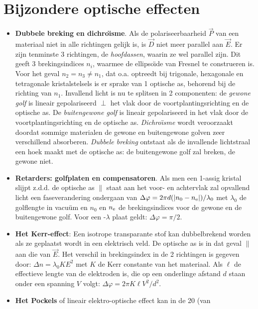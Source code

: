 \documentclass[twoside]{report}
\begin{document}
\section{Bijzondere optische effecten}
\begin{itemize}
\item {\bf Dubbele breking en dichro\"{\i}sme}.
      Als de polariseerbaarheid $\vec{P}$ van een materiaal niet in alle
      richtingen gelijk is, is $\vec{D}$ niet meer parallel aan $\vec{E}$.
      Er zijn tenminste 3 richtingen, de {\it hoofdassen}, waarin ze wel
      parallel zijn. Dit geeft 3 brekingsindices $n_i$, waarmee de
      ellipso\"{\i}de van Fresnel te construeren is. Voor het geval
      $n_2=n_3\neq n_1$, dat o.a. optreedt bij trigonale, hexagonale en
      tetragonale kristalstelsels is er sprake van 1 optische as, behorend bij
      de richting van $n_1$. Invallend licht is nu te splitsen in 2
      componenten: de {\it gewone golf} is lineair gepolariseerd $\perp$ het
      vlak door de voortplantingsrichting en de optische as. De
      {\it buitengewone golf} is lineair gepolariseerd in het vlak door de
      voortplantingsrichting en de optische as.
      {\it Dichro\"{\i}sme} wordt veroorzaakt doordat sommige materialen de
      gewone en buitengewone golven zeer verschillend absorberen.
      {\it Dubbele breking} ontstaat als de invallende lichtstraal een hoek
      maakt met de optische as: de buitengewone golf zal breken, de gewone niet.
\item {\bf Retarders: golfplaten en compensatoren}. Als men een 1-assig
      kristal slijpt z.d.d. de optische as $\parallel$ staat aan het voor- en
      achtervlak zal opvallend licht een faseverandering ondergaan van
      $\Delta\varphi=2\pi d(|n_0-n_{\rm e}|)/\lambda_0$ met $\lambda_0$ de
      golflengte in vacu\"um en $n_0$ en $n_{\rm e}$ de brekingsindices voor
      de gewone en de buitengewone golf. Voor een \kwart-$\lambda$ plaat
      geldt: $\Delta\varphi=\pi/2$.
\item {\bf Het Kerr-effect}: Een isotrope transparante stof kan dubbelbrekend
      worden als ze geplaatst wordt in een elektrisch veld. De optische as is
      in dat geval $\parallel$ aan die van $\vec{E}$. Het verschil in
      brekingsindex in de 2 richtingen is gegeven door: $\Delta n=\lambda_0KE^2$
      met $K$ de Kerr constante van het materiaal. Als $\ell$ de effectieve
      lengte van de elektroden is, die op een onderlinge afstand $d$ staan
      onder een spanning $V$ volgt: $\Delta\varphi=2\pi K\ell V^2/d^2$.
\item {\bf Het Pockels} of lineair elektro-optische effect kan in de 20 (van

\end{itemize}
\end{document}
